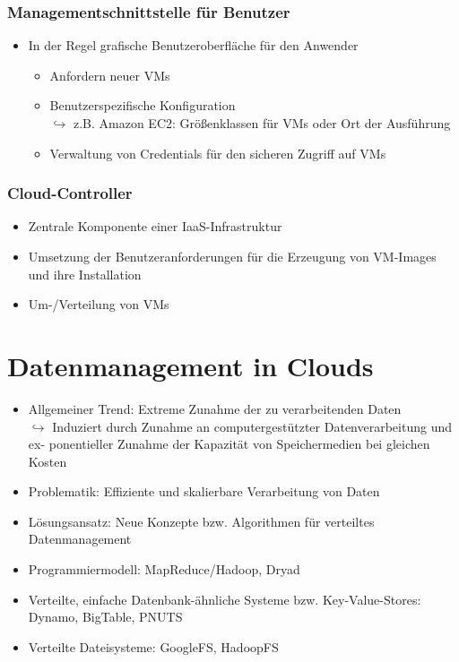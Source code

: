 \documentclass[a4paper,10pt]{scrreprt}
\begin{document}
	\subsubsection{Managementschnittstelle für Benutzer}
	\begin{itemize}
		\item In der Regel grafische Benutzeroberfläche für den Anwender
		\begin{itemize}
			\item Anfordern neuer VMs
			\item Benutzerspezifische Konfiguration\\[5pt]
			$\hookrightarrow$ z.B. Amazon EC2: Größenklassen für VMs oder Ort der Ausführung
			\item Verwaltung von Credentials für den sicheren Zugriff auf VMs
		\end{itemize}
	\end{itemize}
	\subsubsection{Cloud-Controller}
	\begin{itemize}
		\item Zentrale Komponente einer IaaS-Infrastruktur
		\item Umsetzung der Benutzeranforderungen für die Erzeugung von VM-Images und ihre Installation
		\item Um-/Verteilung von VMs
	\end{itemize}
\newpage
	\section{Datenmanagement in Clouds}
	\begin{itemize}
		\item Allgemeiner Trend: Extreme Zunahme der zu verarbeitenden Daten\\[5pt]
		$\hookrightarrow$ Induziert durch Zunahme an computergestützter Datenverarbeitung und ex-\hspace*{12pt} ponentieller Zunahme der Kapazität von Speichermedien bei gleichen Kosten
		\item Problematik: Effiziente und skalierbare Verarbeitung von Daten
		\item Lösungsansatz: Neue Konzepte bzw. Algorithmen für verteiltes Datenmanagement
		\item Programmiermodell: MapReduce/Hadoop, Dryad
		\item Verteilte, einfache Datenbank-ähnliche Systeme bzw. Key-Value-Stores: Dynamo, BigTable, PNUTS
		\item Verteilte Dateisysteme: GoogleFS, HadoopFS
	\end{itemize}
\newpage
\end{document}
